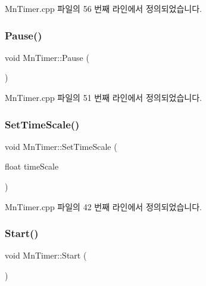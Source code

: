 Mn\+Timer.\+cpp 파일의 56 번째 라인에서 정의되었습니다.

\mbox{\label{class_m_n_l_1_1_mn_timer_ab57c58684ae10509a8ac744683f799e4}} 
\subsubsection{\texorpdfstring{Pause()}{Pause()}}
{\footnotesize\ttfamily void Mn\+Timer\+::\+Pause (\begin{DoxyParamCaption}{ }\end{DoxyParamCaption})}



Mn\+Timer.\+cpp 파일의 51 번째 라인에서 정의되었습니다.

\mbox{\label{class_m_n_l_1_1_mn_timer_af6f75413128d2a40e00e1a07567cf0d6}} 
\subsubsection{\texorpdfstring{Set\+Time\+Scale()}{SetTimeScale()}}
{\footnotesize\ttfamily void Mn\+Timer\+::\+Set\+Time\+Scale (\begin{DoxyParamCaption}\item[{float}]{time\+Scale }\end{DoxyParamCaption})}



Mn\+Timer.\+cpp 파일의 42 번째 라인에서 정의되었습니다.

\mbox{\label{class_m_n_l_1_1_mn_timer_af165e63d407713a60f43f198ce3e93a8}} 
\subsubsection{\texorpdfstring{Start()}{Start()}}
{\footnotesize\ttfamily void Mn\+Timer\+::\+Start (\begin{DoxyParamCaption}{ }\end{DoxyParamCaption})}



